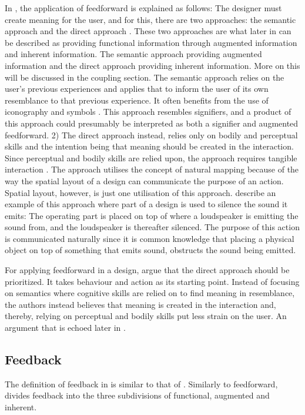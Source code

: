 In , the application of feedforward is explained as follows: The designer must create meaning for the user, and for this, there are two approaches: the semantic approach and the direct approach \cite{howdonald}. These two approaches are what later in  can be described as providing functional information through augmented information and inherent information. The semantic approach providing augmented information and the direct approach providing inherent information. More on this will be discussed in the coupling section. The semantic approach relies on the user's previous experiences and applies that to inform the user of its own resemblance to that previous experience. It often benefits from the use of iconography and symbols \cite{howdonald}. This approach resembles signifiers, and a product of this approach could presumably be interpreted as both a signifier and augmented feedforward. 2) The direct approach instead, relies only on bodily and perceptual skills and the intention being that meaning should be created in the interaction. Since perceptual and bodily skills are relied upon, the approach requires tangible interaction \cite{howdonald}. The approach utilises the concept of natural mapping because of the way the spatial layout of a design can communicate the purpose of an action. Spatial layout, however, is just one utilisation of this approach.  describe an example of this approach where part of a design is used to silence the sound it emits: The operating part is placed on top of where a loudspeaker is emitting the sound from, and the loudspeaker is thereafter silenced. The purpose of this action is communicated naturally since it is common knowledge that placing a physical object on top of something that emits sound, obstructs the sound being emitted.

For applying feedforward in a design,  argue that the direct approach should be prioritized. It takes behaviour and action as its starting point. Instead of focusing on semantics where cognitive skills are relied on to find meaning in resemblance, the authors instead believes that meaning is created in the interaction and, thereby, relying on perceptual and bodily skills put less strain on the user. An argument that is echoed later in .

\subsection{Feedback} The definition of feedback in  is similar to that of . Similarly to feedforward,  divides feedback into the three subdivisions of functional, augmented and inherent.
